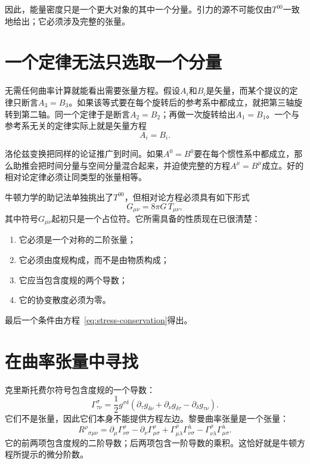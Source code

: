\begin{classroomqa}
\end{classroomqa}

因此，能量密度只是一个更大对象的其中一个分量。引力的源不可能仅由\(T^{00}\)一致地给出；它必须涉及完整的张量。

\section{一个定律无法只选取一个分量}

无需任何曲率计算就能看出需要张量方程。假设\(A_i\)和\(B_i\)是矢量，而某个提议的定律只断言\(A_3=B_3\)。如果该等式要在每个旋转后的参考系中都成立，就把第三轴旋转到第二轴。同一个定律于是断言\(A_2=B_2\)；再做一次旋转给出\(A_1=B_1\)。一个与参考系无关的定律实际上就是矢量方程
\begin{equation}
 A_i=B_i.
\end{equation}

洛伦兹变换把同样的论证推广到时间。如果\(A^0=B^0\)要在每个惯性系中都成立，那么助推会把时间分量与空间分量混合起来，并迫使完整的方程\(A^\mu=B^\mu\)成立。好的相对论定律必须让同类型的张量相等。

牛顿力学的助记法单独挑出了\(T^{00}\)，但相对论方程必须具有如下形式
\begin{equation}
 G_{\mu\nu}=8\pi G\,T_{\mu\nu},
 \label{eq:field-schematic}
\end{equation}
其中符号\(G_{\mu\nu}\)起初只是一个占位符。它所需具备的性质现在已很清楚：
\begin{enumerate}
 \item 它必须是一个对称的二阶张量；
 \item 它必须由度规构成，而不是由物质构成；
 \item 它应当包含度规的两个导数；
 \item 它的协变散度必须为零。
\end{enumerate}
最后一个条件由方程~\eqref{eq:stress-conservation}得出。

\section{在曲率张量中寻找}

克里斯托费尔符号包含度规的一个导数：
\begin{equation}
 \Gamma^\sigma_{\tau\nu}
 =
 \frac12 g^{\sigma\delta}
 \left(
 \partial_\tau g_{\delta\nu}
 +\partial_\nu g_{\delta\tau}
 -\partial_\delta g_{\tau\nu}
 \right).
 \label{eq:christoffel}
\end{equation}
它们不是张量，因此它们本身不能提供方程左边。黎曼曲率张量是一个张量：
\begin{equation}
 R^\rho{}_{\sigma\mu\nu}
 =
 \partial_\mu\Gamma^\rho_{\nu\sigma}
 -\partial_\nu\Gamma^\rho_{\mu\sigma}
 +\Gamma^\rho_{\mu\lambda}\Gamma^\lambda_{\nu\sigma}
 -\Gamma^\rho_{\nu\lambda}\Gamma^\lambda_{\mu\sigma}.
 \label{eq:riemann}
\end{equation}
它的前两项包含度规的二阶导数；后两项包含一阶导数的乘积。这恰好就是牛顿方程所提示的微分阶数。

